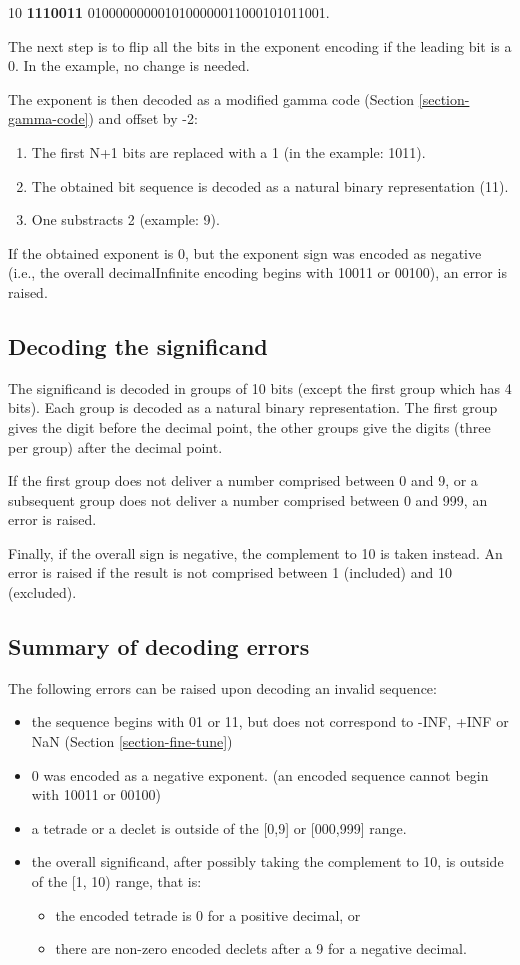 \documentclass[final,leqno,onefignum,onetabnum]{siamltex1213}
\begin{document}
10 \textbf{1110011} 0100000000010100000011000101011001.

The next step is to flip all the bits in the exponent encoding if the leading bit is a 0. In the example, no change is needed.

The exponent is then decoded as a modified gamma code (Section \ref{section-gamma-code}) and offset by -2:

\begin{enumerate}
\item The first N+1 bits are replaced with a 1 (in the example: 1011).
\item The obtained bit sequence is decoded as a natural binary representation (11).
\item One substracts 2 (example: 9).
\end{enumerate}

If the obtained exponent is 0, but the exponent sign was encoded as negative (i.e., the overall decimalInfinite encoding begins with 10011 or 00100), an error is raised.

\subsection{Decoding the significand}

The significand is decoded in groups of 10 bits (except the first group which has 4 bits). Each group is decoded as a natural binary representation. The first group gives the digit before the decimal point, the other groups give the digits (three per group) after the decimal point.

If the first group does not deliver a number comprised between 0 and 9, or a subsequent group does not deliver a number comprised between 0 and 999, an error is raised.

Finally, if the overall sign is negative, the complement to 10 is taken instead. An error is raised if the result is not comprised between 1 (included) and 10 (excluded).

\subsection{Summary of decoding errors}
The following errors can be raised upon decoding an invalid sequence:
\begin{itemize}
\item the sequence begins with 01 or 11, but does not correspond to -INF, +INF or NaN (Section \ref{section-fine-tune})
\item 0 was encoded as a negative exponent. (an encoded sequence cannot begin with 10011 or 00100)
\item a tetrade or a declet is outside of the [0,9] or [000,999] range.
\item the overall significand, after possibly taking the complement to 10, is outside of the [1, 10) range, that is:
\begin{itemize}
\item the encoded tetrade is 0 for a positive decimal, or
\item there are non-zero encoded declets after a 9 for a negative decimal.
\end{itemize}
\end{itemize}
\end{document}
